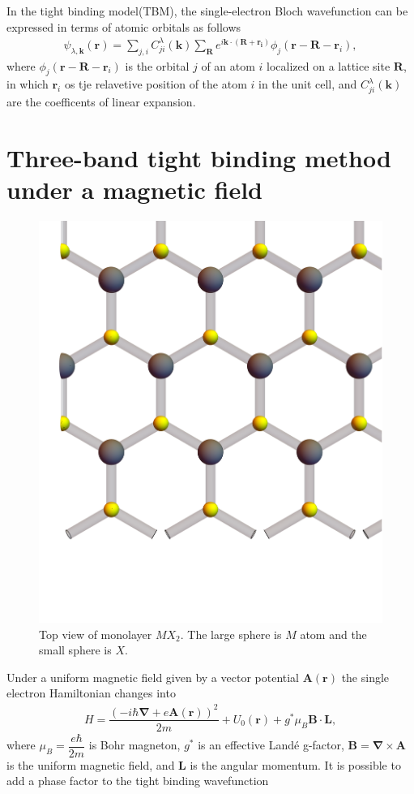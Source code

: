 \documentclass{report}
\newcommand{\f}[2]{\dfrac{#1}{#2}}
\begin{document}
In the tight binding model(TBM), the single-electron Bloch wavefunction can be expressed in terms of atomic orbitals as follows
\begin{gather}
	\psi_{\lambda,\mathbf{k}}(\mathbf{r}) = \sum_{j,i} C_{ji}^{\lambda}(\mathbf{k}) \sum_{\mathbf{R}} e^{i\mathbf{k}\cdot(\mathbf{R+\mathbf{r}_{i}})} \phi_{j}(\mathbf{r} - \mathbf{R} - \mathbf{r}_{i}),
\end{gather}
where $\phi_{j}(\mathbf{r} - \mathbf{R} - \mathbf{r}_{i})$ is the orbital $j$ of an atom $i$ localized on a lattice site $\mathbf{R}$, in which $\mathbf{r}_{i}$ os tje relavetive position of the atom $i$ in the unit cell, and $C_{ji}^{\lambda}(\mathbf{k})$ are the coefficents of linear expansion.

\section{Three-band tight binding method under a magnetic field}
\begin{figure}[htb]
	\centering
	\includegraphics[width=0.5\linewidth,height=0.5\linewidth]{pic/lattice.pdf}
	\caption{\label{fig:Lattice} Top view of monolayer $MX_{2}$. The large sphere is $M$ atom and the small sphere is $X$.}
\end{figure}
Under a uniform magnetic field given by a vector potential $\mathbf{A}(\mathbf{r})$ the single electron Hamiltonian changes into
\begin{align}
	H = \f{\left(-i\hbar \boldsymbol{\nabla} + e \mathbf{A(r)}\right)^{2}}{2m} + U_{0}(\mathbf{r}) + g^{*} \mu_{B} \mathbf{B} \cdot \mathbf{L},
\end{align}
where $\mu_{B} = \f{e\hbar}{2m}$ is Bohr magneton, $g^{*}$ is an effective Landé g-factor, $\mathbf{B} = \boldsymbol{\nabla} \times  \mathbf{A}$ is the uniform magnetic field, and $\mathbf{L}$ is the angular momentum. It is possible to add a phase factor to the tight binding wavefunction
\end{document}
